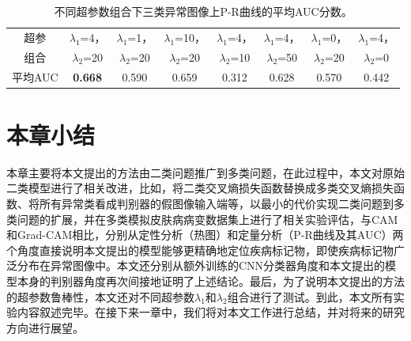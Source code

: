 \begin{table}[H]
	\centering
	\caption[不同超参数组合下三类异常图像上P-R曲线的平均AUC分数]{不同超参数组合下三类异常图像上P-R曲线的平均AUC分数。}
	\label{tab:simulated_skin_diff_parameters}
		\begin{tabular}{c|c|c|c|c|c|c|c}
			\toprule[2pt]
			
			超参& $\lambda_{1}$=4， & $\lambda_{1}$=1，& $\lambda_{1}$=10，&
			$\lambda_{1}$=4， & $\lambda_{1}$=4， &
			$\lambda_{1}$=0， &
			$\lambda_{1}$=4，\\
			组合		  & 
			$\lambda_{2}$=20 & $\lambda_{2}$=20 &
			$\lambda_{2}$=20 & $\lambda_{2}$=10 & $\lambda_{2}$=50 &
			$\lambda_{2}$=20&
			$\lambda_{2}$=0 \\
			\midrule[2pt]



			平均AUC	& \textbf{0.668} &	0.590 & 0.659 & 0.312 & 0.628& 0.570 &	0.442 \\
			\bottomrule[2pt]
		\end{tabular}
\end{table}
\section{本章小结}
本章主要将本文提出的方法由二类问题推广到多类问题，在此过程中，本文对原始二类模型进行了相关改进，比如，将二类交叉熵损失函数替换成多类交叉熵损失函数、将所有异常类看成判别器的假图像输入端等，以最小的代价实现二类问题到多类问题的扩展，并在多类模拟皮肤病病变数据集上进行了相关实验评估，与CAM和Grad-CAM相比，分别从定性分析（热图）和定量分析（P-R曲线及其AUC）两个角度直接说明本文提出的模型能够更精确地定位疾病标记物，即使疾病标记物广泛分布在异常图像中。本文还分别从额外训练的CNN分类器角度和本文提出的模型本身的判别器角度再次间接地证明了上述结论。最后，为了说明本文提出的方法的超参数鲁棒性，本文还对不同超参数$\lambda_{1}$和$\lambda_{2}$组合进行了测试。到此，本文所有实验内容叙述完毕。在接下来一章中，我们将对本文工作进行总结，并对将来的研究方向进行展望。

